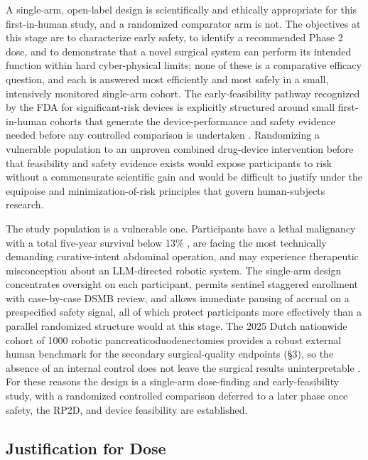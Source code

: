 A single-arm, open-label design is scientifically and ethically appropriate for
this first-in-human study, and a randomized comparator arm is not. The objectives
at this stage are to characterize early safety, to identify a recommended Phase 2
dose, and to demonstrate that a novel surgical system can perform its intended
function within hard cyber-physical limits; none of these is a comparative
efficacy question, and each is answered most efficiently and most safely in a
small, intensively monitored single-arm cohort. The early-feasibility pathway
recognized by the FDA for significant-risk devices is explicitly structured around
small first-in-human cohorts that generate the device-performance and safety
evidence needed before any controlled comparison is undertaken
\cite{fda2013earlyfeasibility}. Randomizing a vulnerable population to an
unproven combined drug-device intervention before that feasibility and safety
evidence exists would expose participants to risk without a commensurate
scientific gain and would be difficult to justify under the equipoise and
minimization-of-risk principles that govern human-subjects research.

The study population is a vulnerable one. Participants have a lethal malignancy
with a total five-year survival below 13\% \cite{Siegel2025}, are facing the most
technically demanding curative-intent abdominal operation, and may experience
therapeutic misconception about an LLM-directed robotic system. The single-arm
design concentrates oversight on each participant, permits sentinel staggered
enrollment with case-by-case DSMB review, and allows immediate pausing of
accrual on a prespecified safety signal, all of which protect participants more
effectively than a parallel randomized structure would at this stage. The 2025
Dutch nationwide cohort of 1000 robotic pancreaticoduodenectomies provides a
robust external human benchmark for the secondary surgical-quality endpoints
(\S3), so the absence of an internal control does not leave the surgical results
uninterpretable \cite{DutchCohort2025}. For these reasons the design is a
single-arm dose-finding and early-feasibility study, with a randomized controlled
comparison deferred to a later phase once safety, the RP2D, and device
feasibility are established.

\subsection{Justification for Dose}

